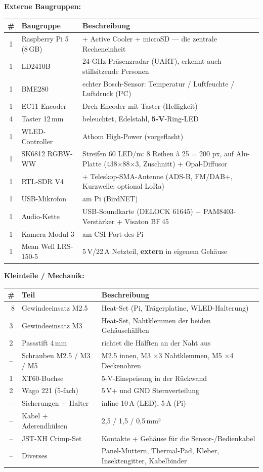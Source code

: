 \textbf{Externe Baugruppen:}\par
{}
\begin{tabular}{clp{88mm}}
\toprule
\textbf{\#} & \textbf{Baugruppe} & \textbf{Beschreibung} \\ \midrule
1 & Raspberry Pi 5 (8\,GB) & + Active Cooler + microSD — die zentrale Recheneinheit \\
1 & LD2410B & 24-GHz-Präsenzradar (UART), erkennt auch stillsitzende Personen \\
1 & BME280 & echter Bosch-Sensor: Temperatur / Luftfeuchte / Luftdruck (I²C) \\
1 & EC11-Encoder & Dreh-Encoder mit Taster (Helligkeit) \\
4 & Taster 12\,mm & beleuchtet, Edelstahl, \textbf{5-V}-Ring-LED \\
1 & WLED-Controller & Athom High-Power (vorgeflasht) \\
1 & SK6812 RGBW-WW & Streifen 60 LED/m: 8 Reihen à 25 = 200 px, auf Alu-Platte (438×88×3, Zuschnitt) + Opal-Diffusor \\
1 & RTL-SDR V4 & + Teleskop-SMA-Antenne (ADS-B, FM/DAB+, Kurzwelle; optional LoRa) \\
1 & USB-Mikrofon & am Pi (BirdNET) \\
1 & Audio-Kette & USB-Soundkarte (DELOCK 61645) + PAM8403-Verstärker + Visaton BF\,45 \\
1 & Kamera Modul 3 & am CSI-Port des Pi \\
1 & Mean Well LRS-150-5 & 5\,V/22\,A Netzteil, \textbf{extern} in eigenem Gehäuse \\
\bottomrule
\end{tabular}

\textbf{Kleinteile / Mechanik:}\par
{}
\begin{tabular}{clp{88mm}}
\toprule
\textbf{\#} & \textbf{Teil} & \textbf{Beschreibung} \\ \midrule
~8 & Gewindeeinsatz M2.5 & Heat-Set (Pi, Trägerplatine, WLED-Halterung) \\
3 & Gewindeeinsatz M3 & Heat-Set, Nahtklemmen der beiden Gehäusehälften \\
2 & Passstift 4\,mm & richtet die Hälften an der Naht aus \\
-- & Schrauben M2.5 / M3 / M5 & M2.5 innen, M3 ×3 Nahtklemmen, M5 ×4 Deckenohren \\
1 & XT60-Buchse & 5-V-Einspeisung in der Rückwand \\
2 & Wago 221 (5-fach) & 5\,V+ und GND Sternverteilung \\
-- & Sicherungen + Halter & inline 10\,A (LED), 5\,A (Pi) \\
-- & Kabel + Aderendhülsen & 2,5 / 1,5 / 0,5\,mm² \\
-- & JST-XH Crimp-Set & Kontakte + Gehäuse für die Sensor-/Bedienkabel \\
-- & Diverses & Panel-Muttern, Thermal-Pad, Kleber, Insektengitter, Kabelbinder \\
\bottomrule
\end{tabular}

